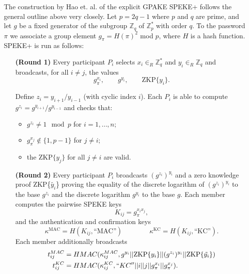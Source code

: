 The construction by Hao et. al. of the explicit GPAKE SPEKE+ follows the general outline above very closely.  Let $p = 2q - 1$ where $p$ and $q$ are prime, and let $g$ be a fixed generator of the subgroup $\mathbb{Z}_q$ of $\mathbb{Z}_p^*$ with order $q$.  To the password $\pi$ we associate a group element $g_{\pi} = H(\pi)^2$ mod $p$, where $H$ is a hash function. SPEKE+ is run as follows:
\\

\begin{itemize}
    \item[\textbf{(Round 1)}] Every participant $P_i$ selects $x_i\in_R \mathbb{Z}_q^*$ and $y_i\in_R \mathbb{Z}_q$ and 
        broadcasts, for all $i \neq j$, the values
        \[g_{\pi}^{x_i} , \qquad g^{y_i}, \qquad \text{ZKP}\{y_i\}.\]
    \item[]
    \item[] Define $z_i = y_{i+1} / y_{i-1}$ (with cyclic index $i$). Each $P_i$ is able to compute $g^{z_i} = g^{y_{i+1}} / g^{y_{i-1}}$ and checks that:
    \begin{itemize}
            \item $g^{z_i} \neq 1 \mod p$ for $i = 1, \ldots, n$;
            \item $g_{\pi}^{x_j} \notin \{1,p-1\}$ for $j \neq i$;
            \item the $\text{ZKP}\{y_j\}$ for all $j \neq i$ are valid.
        \end{itemize}
    \item[]
    \item[\textbf{(Round 2)}] Every participant $P_i$ broadcasts $(g^{z_i})^{y_i}$ and a zero knowledge proof
        ZKP\{$\tilde{y_i}$\} proving the equality of the discrete logarithm of $(g^{z_i})^{y_i}$ to the base
        $g^{z_i}$ and the discrete logarithm $g^{y_i}$ to the base $g$. Each member computes the pairwise SPEKE keys
        \[ K_{ij} = g_{\pi}^{x_ix_j}, \]
        and the authentication and confirmation keys
        \[\kappa^{\text{MAC}} = H(K_{ij}, \text{``MAC''})\qquad\qquad \kappa^{\text{KC}} = H(K_{ij}, \text{``KC''}).\]
        Each member additionally broadcasts 
        \begin{align*}
        t_{ij}^{MAC} &= HMAC(\kappa_{ij}^{MAC},  g^{y_i} || \text{ZKP}\{y_i\} || (g^{z_i})^{y_i} || \text{ZKP}\{\tilde{y_i}\})\\
        t_{ij}^{KC} &= HMAC(\kappa_{ij}^{KC}, ``KC'' || i || j || g_{\pi}^{x_i} || g_{\pi}^{x_j}).
        \end{align*}
    \item[]

\end{itemize}
